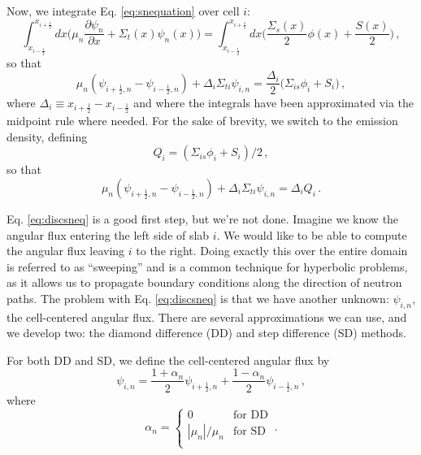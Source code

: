 Now, we integrate Eq. \ref{eq:snequation} over cell $i$:
\begin{equation}
  \int^{x_{i+\frac{1}{2}}}_{x_{i-\frac{1}{2}}} dx \Big ( \mu_n \frac{\partial \psi_n}{\partial x} + \Sigma_t(x)\psi_n(x) \Big ) =  \int^{x_{i+\frac{1}{2}}}_{x_{i-\frac{1}{2}}} dx  \Big ( \frac{\Sigma_s(x)}{2} \phi(x) + \frac{S(x)}{2} \Big ) \, ,
\end{equation}
so that
\begin{equation}
   \mu_n ( \psi_{i+\frac{1}{2},n} - \psi_{i-\frac{1}{2},n} ) + \Delta_i \Sigma_{ti}\psi_{i,n} =  \frac{\Delta_i}{2} \Big ( \Sigma_{is} \phi_i +  S_i \Big ) \, ,
\end{equation}
where $\Delta_i \equiv x_{i+\frac{1}{2}} - x_{i-\frac{1}{2}}$ and where the integrals have been approximated via the midpoint rule where needed.  For the sake of brevity, we switch to the emission density, defining
\begin{equation}
 Q_i =  (\Sigma_{is} \phi_i +  S_i)/2 \, ,
\end{equation}
so that
\begin{equation}
   \mu_n ( \psi_{i+\frac{1}{2},n} - \psi_{i-\frac{1}{2},n} ) + \Delta_i \Sigma_{ti}\psi_{i,n} =  \Delta_i Q_i \, .
   \label{eq:discsneq}
\end{equation}

Eq. \ref{eq:discsneq} is a good first step, but we're not done.  Imagine we know the angular flux entering the left side of slab $i$.  We would like to be able to compute the angular flux leaving $i$ to the right.  Doing exactly this over the entire domain is referred to as ``sweeping'' and is a common technique for hyperbolic problems, as it allows us to propagate boundary conditions along the direction of neutron paths.  The problem with Eq. \ref{eq:discsneq} is that we have another unknown: $\psi_{i,n}$, the cell-centered angular flux.  There are several approximations we can use, and we develop two: the diamond difference (DD) and step difference (SD) methods.

For both DD and SD, we define the cell-centered angular flux by
\begin{equation}
 \psi_{i,n} = \frac{1+\alpha_n}{2} \psi_{i+\frac{1}{2},n} + \frac{1-\alpha_n}{2} \psi_{i-\frac{1}{2},n}  \, ,
 \label{eq:ccpsi}
\end{equation}
where
\begin{equation}
 \alpha_n =
 \begin{cases} 0             &   \text{for DD}  \\
               |\mu_n|/\mu_n &   \text{for SD}  \\
 \end{cases} \, .
 \label{eq:alpha}
\end{equation}

